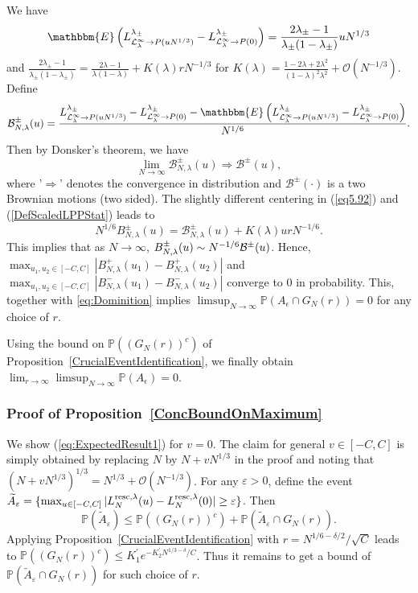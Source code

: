 \documentclass[12pt,a4paper]{article}
\numberwithin{equation}{section}
\newcommand{\Or}{\mathcal{O}}
\newcommand{\Pb}{\mathbb{P}}
\newcommand{\E}{\mathbbm{E}}
\newcommand{\e}{\varepsilon}
\begin{document}
We have
\begin{equation}\label{eq5.92}
\E\left(L^{\lambda_\pm}_{{\cal L}_{\lambda}^\infty\to P(uN^{1/3})}- L^{\lambda_\pm}_{{\cal L}_{\lambda}^\infty\to P(0)}\right) =\frac{2\lambda_\pm-1}{\lambda_\pm(1-\lambda_\pm)} uN^{1/3}
\end{equation}
and $\frac{2\lambda_\pm-1}{\lambda_\pm(1-\lambda_\pm)} =\frac{2\lambda-1}{\lambda(1-\lambda)}+K(\lambda)rN^{-1/3}$ for $K(\lambda)=\frac{1-2\lambda+2\lambda^2}{(1-\lambda)^2\lambda^2}+\Or(N^{-1/3})$. Define
\begin{equation}\label{eq5.92b}
\mathcal{B}^{\pm}_{N,\lambda}(u)=\frac{L^{\lambda_\pm}_{{\cal L}_{\lambda}^\infty\to P(uN^{1/3})}- L^{\lambda_\pm}_{{\cal L}_{\lambda}^\infty\to P(0)}-\E\left(L^{\lambda_\pm}_{{\cal L}_{\lambda}^\infty\to P(uN^{1/3})}- L^{\lambda_\pm}_{{\cal L}_{\lambda}^\infty\to P(0)}\right)}{N^{1/6}}.
\end{equation}
Then by Donsker's theorem, we have
\begin{equation}\label{eq5.93}
\lim_{N\to\infty}\mathcal{B}^{\pm}_{N,\lambda}(u)\Rightarrow \mathcal{B}^{\pm}(u),
\end{equation}
where '$\Rightarrow$' denotes the convergence in distribution and $\mathcal{B}^{\pm}(\cdot)$ is a two Brownian motions (two sided). The slightly different centering in (\ref{eq5.92}) and (\ref{DefScaledLPPStat}) leads to
\begin{equation}\label{eq5.94}
N^{1/6} B^{\pm}_{N,\lambda}(u)=\mathcal{B}^\pm_{N,\lambda}(u)+K(\lambda)u r N^{-1/6}.
\end{equation}
This implies that as $N\to\infty$, $B^{\pm}_{N,\lambda}(u) \sim N^{-1/6} {\cal B}^\pm(u)$. Hence, $\max_{u_1,u_2\in[-C,C]} \left|B^{+}_{N,\lambda}(u_1) - B^{+}_{N,\lambda}(u_2)\right|$ and $\max_{u_1,u_2\in[-C,C]} \left|B^{-}_{N,\lambda}(u_1) - B^{-}_{N,\lambda}(u_2)\right|$ converge to $0$ in probability. This, together with \eqref{eq:Dominition} implies $\limsup_{N\to \infty}\Pb\left(A_\epsilon\cap G_N(r)\right)=0$ for any choice of $r$.

Using the bound on $\Pb((G_N(r))^c)$ of Proposition~\ref{CrucialEventIdentification}, we finally obtain $\lim_{r\to\infty}\limsup_{N\to\infty} \Pb\left(A_\epsilon\right)=0$.

\subsubsection{Proof of Proposition~\ref{ConcBoundOnMaximum}}
We show (\ref{eq:ExpectedResult1}) for $v=0$. The claim for general $v\in [-C,C]$ is simply obtained by replacing $N$ by $N+v N^{1/3}$ in the proof and noting that $(N+vN^{1/3})^{1/3}=N^{1/3}+\Or(N^{-1/3})$. For any $\e>0$, define the event \mbox{$\widetilde A_\e=\{\max_{u\in [-C,C]}|L^{{\rm resc},\lambda}_N(u)-L^{{\rm resc},\lambda}_N(0)|\geq \e\}$}. Then
\begin{equation}
\Pb(\widetilde A_\e)\leq \Pb((G_N(r))^c)+\Pb(\widetilde A_\e\cap G_N(r)).
\end{equation}
Applying Proposition~\ref{CrucialEventIdentification} with $r=N^{1/6-\delta/2}/\sqrt{C}$ leads to $\Pb((G_N(r))^c)\leq K^{\prime}_1e^{-K^{\prime}_2 N^{1/3-\delta}/C}$. Thus it remains to get a bound of $\Pb(\widetilde A_\e\cap G_N(r))$ for such choice of $r$.
\end{document}
